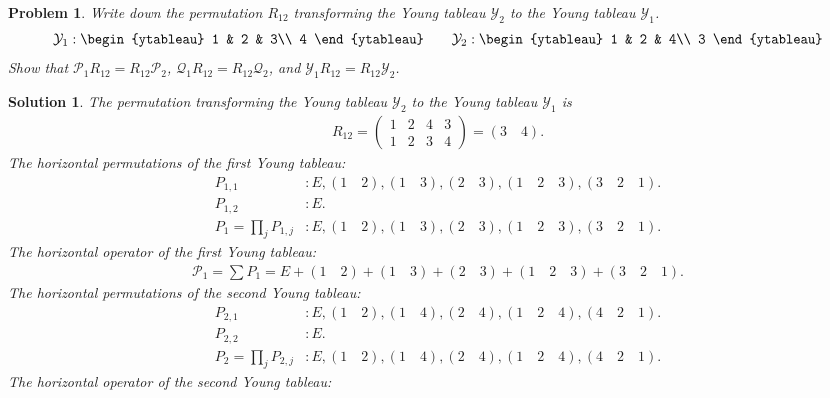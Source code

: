 \documentclass[UTF8,10pt,a4paper]{article}
\theoremstyle{Problem}
\newtheorem{prob}{Problem}
\theoremstyle{Solution}
\newtheorem*{sol}{Solution}
\begin{document}
\begin{prob}
    Write down the permutation $R_{12}$ transforming the Young tableau $\mathcal{Y}_2$ to the Young tableau $\mathcal{Y}_1$.
    \[
        \mathcal{Y}_1:
        \begin{ytableau}
            1 & 2 & 3\\
            4
        \end{ytableau}
        \qquad\mathcal{Y}_2:
        \begin{ytableau}
            1 & 2 & 4\\
            3
        \end{ytableau}
    \]
    Show that $\mathcal{P}_1R_{12}=R_{12}\mathcal{P}_2$, $\mathcal{Q}_1R_{12}=R_{12}\mathcal{Q}_2$, and $\mathcal{Y}_1R_{12}=R_{12}\mathcal{Y}_2$.
\end{prob}
\begin{sol}
    The permutation transforming the Young tableau $\mathcal{Y}_2$ to the Young tableau $\mathcal{Y}_1$ is
    \begin{align}
        R_{12}=\left(\begin{matrix}
            1 & 2 & 4 & 3\\
            1 & 2 & 3 & 4
        \end{matrix}\right)=(3\quad 4).
    \end{align}
    The horizontal permutations of the first Young tableau:
    \begin{align}
        P_{1,1}&:E,(1\quad 2),(1\quad 3),(2\quad 3),(1\quad 2\quad 3),(3\quad 2\quad 1).\\
        P_{1,2}&:E.\\
        P_1=\prod_jP_{1,j}&:E,(1\quad 2),(1\quad 3),(2\quad 3),(1\quad 2\quad 3),(3\quad 2\quad 1).
    \end{align}
    The horizontal operator of the first Young tableau:
    \begin{align}
        \mathcal{P}_1=\sum P_1=E+(1\quad 2)+(1\quad 3)+(2\quad 3)+(1\quad 2\quad 3)+(3\quad 2\quad 1).
    \end{align}
    The horizontal permutations of the second Young tableau:
    \begin{align}
        P_{2,1}&:E,(1\quad 2),(1\quad 4),(2\quad 4),(1\quad 2\quad 4),(4\quad 2\quad 1).\\
        P_{2,2}&:E.\\
        P_2=\prod_jP_{2,j}&:E,(1\quad 2),(1\quad 4),(2\quad 4),(1\quad 2\quad 4),(4\quad 2\quad 1).
    \end{align}
    The horizontal operator of the second Young tableau:

\end{sol}
\end{document}
